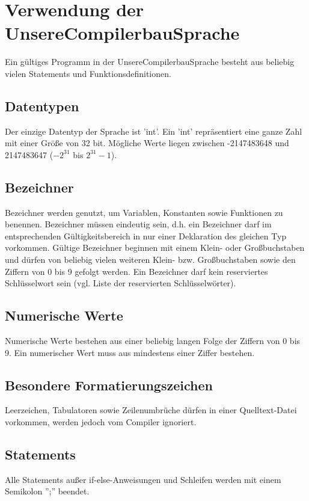 
\section{Verwendung der UnsereCompilerbauSprache}
Ein gültiges Programm in der UnsereCompilerbauSprache besteht aus beliebig vielen Statements und Funktionsdefinitionen. 

\subsection{Datentypen}
Der einzige Datentyp der Sprache ist 'int'. Ein 'int' repräsentiert eine ganze Zahl mit einer Größe von 32 bit. Mögliche Werte liegen zwischen -2147483648 und 2147483647 ($-2^{31}$ bis $2^{31} - 1$). %

\subsection{Bezeichner}
Bezeichner werden genutzt, um Variablen, Konstanten sowie Funktionen zu benennen.
Bezeichner müssen eindeutig sein, d.h. ein Bezeichner darf im entsprechenden Gültigkeitsbereich in nur einer Deklaration des gleichen Typ vorkommen. Gültige Bezeichner beginnen mit einem Klein- oder Großbuchstaben und dürfen von beliebig vielen weiteren Klein- bzw. Großbuchstaben sowie den Ziffern von 0 bis 9 gefolgt werden. Ein Bezeichner darf kein reserviertes Schlüsselwort sein (vgl. Liste der reservierten Schlüsselwörter).

\subsection{Numerische Werte}
Numerische Werte bestehen aus einer beliebig langen Folge der Ziffern von 0 bis 9. Ein numerischer Wert muss aus mindestens einer Ziffer bestehen.

\subsection{Besondere Formatierungszeichen} 
Leerzeichen, Tabulatoren sowie Zeilenumbrüche dürfen in einer Quelltext-Datei vorkommen, werden jedoch vom Compiler ignoriert.

\subsection{Statements}
Alle Statements außer if-else-Anweisungen und Schleifen werden mit einem Semikolon '';'' beendet.


